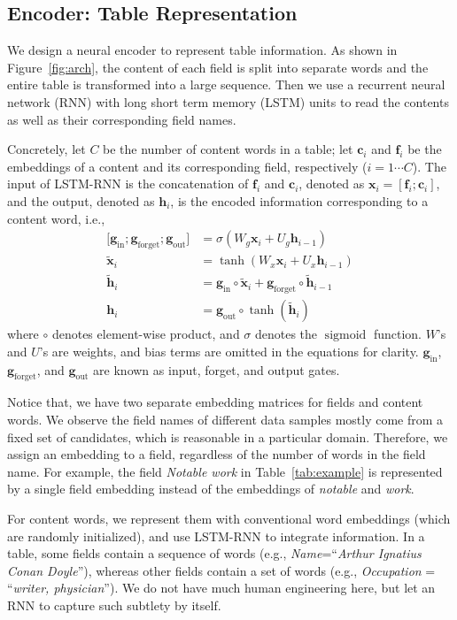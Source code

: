 \documentclass[letterpaper]{article} %
\begin{document}
\subsection{Encoder: Table Representation}

We design a neural encoder to represent table information.
As shown in Figure~\ref{fig:arch}, the content of each field is split into separate words and the entire table is transformed into a large sequence. Then we use a recurrent neural network (RNN) with long short term memory (LSTM) units \cite{lstm} to read the contents as well as their corresponding field names.

Concretely, let $C$ be the number of content words in a table; let $\bm c_i$ and $\bm f_i$ be the embeddings of a content and its corresponding field, respectively ($i=1\cdots C$). The input of LSTM-RNN is the concatenation of $\bm f_i$ and $\bm c_i$, denoted as $\bm x_i=[\bm f_i; \bm c_i]$, and the output, denoted as $\bm h_i$, is the encoded information corresponding to a content word, i.e.,
\begin{align}\label{eq:lstm:begin}
\big[\bm g_\text{in}; \bm g_\text{forget}; \bm g_\text{out}\big]  &= \sigma(W_g\bm x_i+U_g\bm h_{i-1}) \\
\widetilde{\bm x}_i&=\tanh(W_x\bm x_i+U_x\bm h_{i-1}) \\
\widetilde{\bm h}_i &= \bm g_\text{in}\circ \widetilde{\bm x}_i + \bm g_\text{forget}\circ \widetilde{\bm h}_{i-1}\\
\bm h_i &= \bm g_\text{out} \circ \tanh(\widetilde{\bm h}_i)\label{eq:lstm:end}
\end{align}
where $\circ$ denotes element-wise product, and $\sigma$ denotes the $\operatorname{sigmoid}$ function. $W$'s and $U$'s are weights, and bias terms are omitted in the equations for clarity. $\bm g_\text{in}$, $\bm g_\text{forget}$, and $\bm g_\text{out}$ are known as input, forget, and output gates.

Notice that, we have two separate embedding matrices for fields and content words. We observe the field names of different data samples  mostly come from a fixed set of candidates, which is reasonable in a particular domain. Therefore, we assign an embedding to a field, regardless of the number of words in the field name. For example, the field \textit{Notable work} in Table~\ref{tab:example} is represented by a single field embedding instead of the embeddings of \textit{notable} and \textit{work}.

For content words, we represent them with conventional word embeddings (which are randomly initialized), and use LSTM-RNN to integrate information. In a table, some fields contain a sequence of words (e.g., \textit{Name}=``\textit{Arthur Ignatius Conan Doyle}''), whereas other fields contain a set of words (e.g., \textit{Occupation} = ``\textit{writer, physician}''). We do not have much human engineering here, but let an RNN to capture such subtlety by itself.
\end{document}
